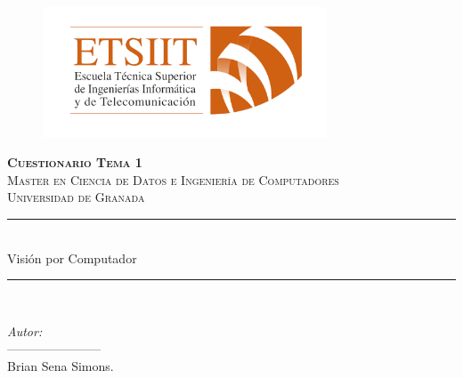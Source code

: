 \documentclass[12pt,letterpaper]{article}
\author{Brian Sena Simons} %
\date{\normalsize\today} %
\newcommand{\horrule}[1]{\rule{\linewidth}{#1}} %
\begin{document}
%
\begin{titlepage}
\begin{figure}[H]
    \vspace{-1.3cm}
    \begin{center}
        \includegraphics[width=0.75\textwidth]{Etsiit}
    \end{center}
\end{figure}
\vspace{1.3cm}
\centering
\normalfont \normalsize
\textsc{\textbf{Cuestionario Tema 1}\\ \vspace{.15cm} Master en Ciencia de Datos e Ingeniería de Computadores \\ \vspace{.15cm} Universidad de Granada} \\ [25pt] %
    \horrule{0.5pt} \\[0.4cm] %
    \huge Visión por Computador\\ %
    \horrule{2pt} \\[0.5cm] %

\begin{minipage}{0.4\textwidth}
    \begin{flushleft}\large
        \emph{Autor:} \\
         ----------------------- \\
        \vspace{.15cm}
        Brian Sena Simons. \\

    \end{flushleft}
\end{minipage}
\begin{minipage}{0.4\textwidth}
    \begin{flushright}\large
    \end{flushright}
\end{minipage}
\end{titlepage}
\end{document}
